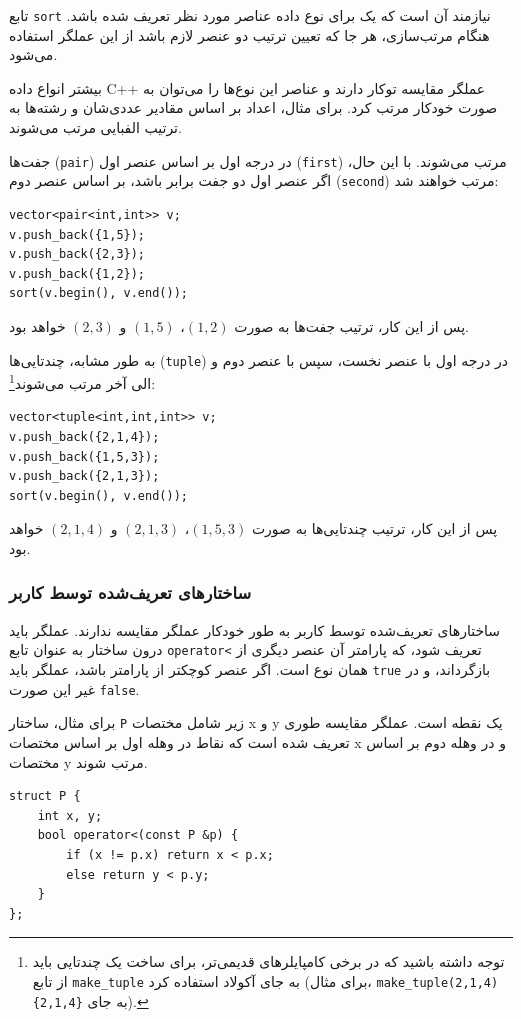 تابع \texttt{sort} نیازمند آن است که
یک  برای نوع داده
عناصر مورد نظر تعریف شده باشد.
هنگام مرتب‌سازی، هر جا که تعیین ترتیب دو عنصر لازم باشد
از این عملگر استفاده می‌شود.

بیشتر انواع داده C++ عملگر مقایسه توکار دارند
و عناصر این نوع‌ها را می‌توان به صورت خودکار مرتب کرد.
برای مثال، اعداد بر اساس مقادیر عددی‌شان
و رشته‌ها به ترتیب الفبایی مرتب می‌شوند.


جفت‌ها (\texttt{pair}) در درجه اول بر اساس
عنصر اول (\texttt{first}) مرتب می‌شوند.
با این حال، اگر عنصر اول دو جفت برابر باشد،
بر اساس عنصر دوم (\texttt{second}) مرتب خواهند شد:
\begin{lstlisting}
vector<pair<int,int>> v;
v.push_back({1,5});
v.push_back({2,3});
v.push_back({1,2});
sort(v.begin(), v.end());
\end{lstlisting}
پس از این کار، ترتیب جفت‌ها به صورت
$(1,2)$، $(1,5)$ و $(2,3)$ خواهد بود.


به طور مشابه، چندتایی‌ها (\texttt{tuple})
در درجه اول با عنصر نخست،
سپس با عنصر دوم و الی آخر مرتب می‌شوند\footnote{توجه داشته باشید که در برخی کامپایلرهای قدیمی‌تر،
برای ساخت یک چندتایی باید از تابع \texttt{make\_tuple} به جای
آکولاد استفاده کرد (برای مثال، \texttt{make\_tuple(2,1,4)} به جای \texttt{\{2,1,4\}}).}:
\begin{lstlisting}
vector<tuple<int,int,int>> v;
v.push_back({2,1,4});
v.push_back({1,5,3});
v.push_back({2,1,3});
sort(v.begin(), v.end());
\end{lstlisting}
پس از این کار، ترتیب چندتایی‌ها به صورت
$(1,5,3)$، $(2,1,3)$ و $(2,1,4)$ خواهد بود.

\subsubsection{ساختارهای تعریف‌شده توسط کاربر}

ساختارهای تعریف‌شده توسط کاربر به طور خودکار عملگر مقایسه ندارند.
عملگر باید درون ساختار به عنوان تابع \texttt{operator<} تعریف شود،
که پارامتر آن عنصر دیگری از همان نوع است.
اگر عنصر کوچکتر از پارامتر باشد، عملگر باید \texttt{true} بازگرداند،
و در غیر این صورت \texttt{false}.

برای مثال، ساختار \texttt{P} زیر شامل مختصات x و y یک نقطه است.
عملگر مقایسه طوری تعریف شده است که
نقاط در وهله اول بر اساس مختصات x
و در وهله دوم بر اساس مختصات y مرتب شوند.

\begin{lstlisting}
struct P {
    int x, y;
    bool operator<(const P &p) {
        if (x != p.x) return x < p.x;
        else return y < p.y;
    }
};
\end{lstlisting}

